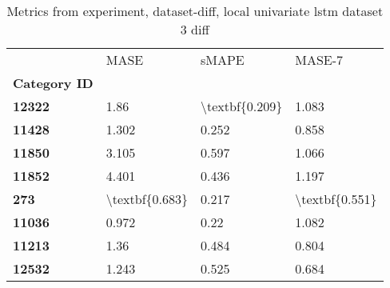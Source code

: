 \begin{table}[h]
\centering
\caption{Metrics from experiment, dataset-diff, local univariate lstm dataset 3 diff}
\label{table:local-univariate-lstm-dataset-3-diff-dataset-diff}
\begin{tabular}{llll}
\toprule
{} &            MASE &           sMAPE &          MASE-7 \\
\textbf{Category ID} &                 &                 &                 \\
\midrule
\textbf{12322      } &            1.86 &  \textbackslash textbf\{0.209\} &           1.083 \\
\textbf{11428      } &           1.302 &           0.252 &           0.858 \\
\textbf{11850      } &           3.105 &           0.597 &           1.066 \\
\textbf{11852      } &           4.401 &           0.436 &           1.197 \\
\textbf{273        } &  \textbackslash textbf\{0.683\} &           0.217 &  \textbackslash textbf\{0.551\} \\
\textbf{11036      } &           0.972 &            0.22 &           1.082 \\
\textbf{11213      } &            1.36 &           0.484 &           0.804 \\
\textbf{12532      } &           1.243 &           0.525 &           0.684 \\
\bottomrule
\end{tabular}
\end{table}
